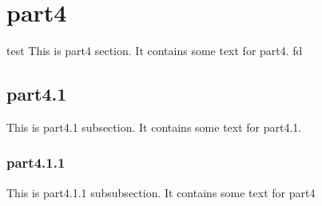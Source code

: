 \section{part4} 
test
This is part4 section. It contains some text for part4.    
fd 
\subsection{part4.1}
This is part4.1 subsection. It contains some text for part4.1.
\subsubsection{part4.1.1}
This is part4.1.1 subsubsection. It contains some text for part4